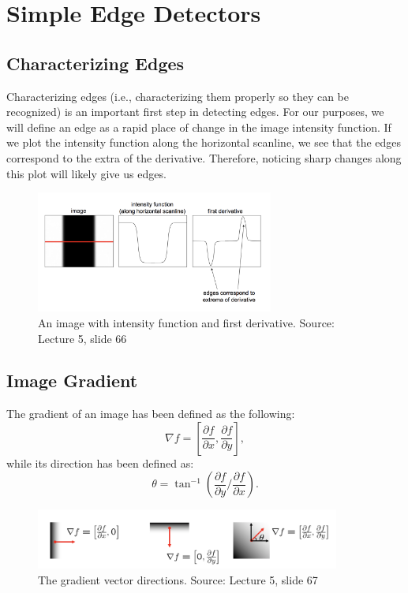 \documentclass{article}
\begin{document}
\section{Simple Edge Detectors}

\subsection{Characterizing Edges}
Characterizing edges (i.e., characterizing them properly so they can be recognized) is an important first step in detecting edges. For our purposes, we will define an edge as a rapid place of change in the image intensity function. If we plot the intensity function along the horizontal scanline, we see that the edges correspond to the extra of the derivative. Therefore, noticing sharp changes along this plot will likely give us edges.

\begin{figure}[H]
\centering
\includegraphics[height=4cm]{lazebnik.png}
\caption{An image with intensity function and first derivative. Source: Lecture 5, slide 66}
\end{figure}

\subsection{Image Gradient}
The gradient of an image has been defined as the following:
$$\nabla f = \left[ \frac{\partial f}{\partial x}, \frac{\partial f}{\partial y}\right],$$
while its direction has been defined as:
$$\theta = \tan^{-1} \left( \frac{\partial f}{\partial y} / \frac{\partial f}{\partial x} \right).$$


\begin{figure}[H]
\centering
\includegraphics[width=10cm]{seitz_gradient_direction.png}
\caption{The gradient vector directions. Source: Lecture 5, slide 67}
\end{figure}
\end{document}
